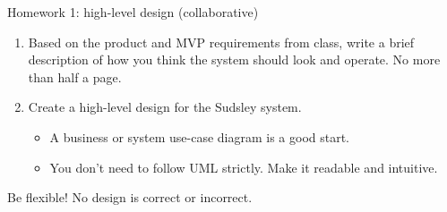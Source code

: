 \documentclass[aspectratio=169]{beamer}
\begin{document}
\begin{frame}{Homework 1: high-level design (collaborative)}
  \begin{enumerate}
    \item Based on the product and MVP requirements from class, write a brief description of
      how you think the system should look and operate. No more than half a page.
    \item Create a high-level design for the Sudsley system.
      \begin{itemize}
        \item A business or system use-case diagram is a good start.
        \item You don't need to follow UML strictly. Make it readable and intuitive.
      \end{itemize}
  \end{enumerate}
  \alert{Be flexible! No design is correct or incorrect.}
\end{frame}
\end{document}
